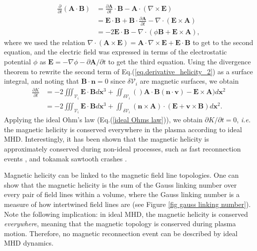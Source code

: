 \documentclass[my_thesis.tex]{subfiles}
\begin{document}
\begin{align}
	\frac{\partial}{\partial t}(\mathbf{A}\cdot\mathbf{B}) &= \frac{\partial\mathbf{A}}{\partial t}\cdot \mathbf{B} - \mathbf{A}\cdot(\nabla\times\mathbf{E})\\
	&= \mathbf{E}\cdot\mathbf{B} + \mathbf{B}\cdot\frac{\partial \mathbf{A}}{\partial t} - \nabla\cdot(\mathbf{E}\times\mathbf{A})\\
	&= -2\mathbf{E}\cdot\mathbf{B} - \nabla\cdot(\phi \mathbf{B}+\mathbf{E}\times\mathbf{A}), \label{eq.derivative_helicity_2}
\end{align}
where we used the relation $\nabla\cdot(\mathbf{A}\times\mathbf{E})=\mathbf{A}\cdot\nabla\times\mathbf{E}+\mathbf{E}\cdot\mathbf{B}$ to get to the second equation, and the electric field was expressed in terms of the electrostatic potential $\phi$ as $\mathbf{E}=-\nabla\phi-\partial\mathbf{A}/\partial t$ to get the third equation. Using the divergence theorem to rewrite the second term of Eq.(\ref{eq.derivative_helicity_2}) as a surface integral, and noting that $\mathbf{B}\cdot\mathbf{n}=0$ since $\delta\mathcal{V}_i$ are magnetic surfaces, we obtain
\begin{align}
	\frac{\partial K}{\partial t} &= -2\iiint_{\mathcal{V}_i}\mathbf{E}\cdot\mathbf{B} d\mathbf{x}^3 + \iint_{\delta\mathcal{V}_i}()\mathbf{A}\cdot\mathbf{B}(\mathbf{n}\cdot\mathbf{v}) -  \mathbf{E}\times\mathbf{A}) d\mathbf{x}^2\\
	&= -2\iiint_{\mathcal{V}_i}\mathbf{E}\cdot\mathbf{B} d\mathbf{x}^3 + \iint_{\delta\mathcal{V}_i}(\mathbf{n}\times\mathbf{A})\cdot(\mathbf{E}+\mathbf{v}\times\mathbf{B})d\mathbf{x}^2.
\end{align}
Applying the ideal Ohm's law (Eq.(\ref{ideal Ohms law})), we obtain $\partial K/\partial t = 0$, \textit{i.e.} the magnetic helicity is conserved everywhere in the plasma according to ideal MHD. Interestingly, it has been shown that the magnetic helicity is approximately conserved during non-ideal processes, such as fast reconnection events \citep{bergerIntroductionMagneticHelicity1999}, and tokamak sawtooth crashes \citep{Heidbrink2000}. 

Magnetic helicity can be linked to the magnetic field line topologies. One can show \citep{moffattDegreeKnottednessTangled1969, arnoldTopologicalPropertiesMagnetic1998, bergerIntroductionMagneticHelicity1999} that the magnetic helicity is the sum of the Gauss linking number over every pair of field lines within a volume, where the Gauss linking number is a measure of how intertwined field lines are (see Figure \ref{fig gauss linking number}). Note the following implication: in ideal MHD, the magnetic helicity is conserved \emph{everywhere}, meaning that the magnetic topology is conserved during plasma motion. Therefore, no magnetic reconnection event can be described by ideal MHD dynamics.
\end{document}
